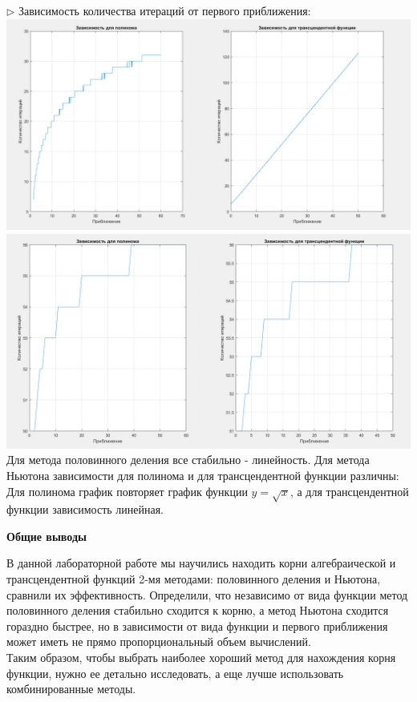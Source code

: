 \documentclass{article}
\begin{document}
	$\triangleright$ Зависимость количества итераций от первого приближения:\\
	\includegraphics[scale = 0.2]{Приближения Ньютон}
	\includegraphics[scale = 0.2]{Приближения МПД}\\
	Для метода половинного деления все стабильно - линейность.
	Для метода Ньютона зависимости для полинома и для трансцендентной функции различны:\\
	Для полинома график повторяет график функции $y = \sqrt{x}$, а для трансцендентной функции зависимость линейная.\\
	\begin{center} \textbf{Общие выводы}\end{center}
	В данной лабораторной работе мы научились находить корни алгебраической и трансцендентной функций 2-мя методами: половинного деления и Ньютона, сравнили их эффективность. Определили, что независимо от вида функции метод половинного деления стабильно сходится к корню, а метод Ньютона сходится гораздно быстрее, но в зависимости от вида функции и первого приближения может иметь не прямо пропорциональный объем вычислений.\\
	Таким образом, чтобы выбрать наиболее хороший метод для нахождения корня функции, нужно ее детально исследовать, а еще лучше использовать комбинированные методы. 
\end{document}
